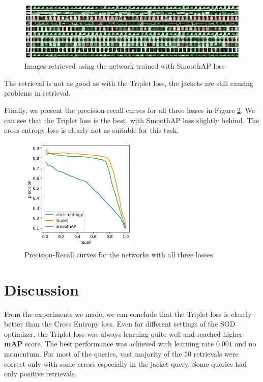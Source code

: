 \documentclass[a4paper,11pt]{article}
\begin{document}
\begin{figure}[ht]
    \centering
    \includegraphics[width=\textwidth]{../outputs/sap_retrieval.png}
    \caption{Images retrieved using the network trained with SmoothAP loss}
    \label{fig:retrieval_sap}
\end{figure}

The retrieval is not as good as with the Triplet loss, the jackets are still causing problems in retrieval.

Finally, we present the precision-recall curves for all three losses in Figure \ref{fig:pr}.
We can see that the Triplet loss is the best, with SmoothAP loss slightly behind.
The cross-entropy loss is clearly not as suitable for this task.

\begin{figure}[ht]
    \centering
    \includegraphics[width=0.5\textwidth]{../outputs/pr.png}
    \caption{Precision-Recall curves for the networks with all three losses}
    \label{fig:pr}
\end{figure}

\section{Discussion}
From the experiments we made, we can conclude that the Triplet loss is clearly better than the Cross Entropy loss.
Even for different settings of the SGD optimizer, the Triplet loss was always learning quite well and reached higher \textbf{mAP} score.
The best performance was achieved with learning rate $0.001$ and no momentum.
For most of the queries, vast majority of the $50$ retrievals were correct only with some errors especially in the jacket query.
Some queries had only positive retrievals.
\end{document}
